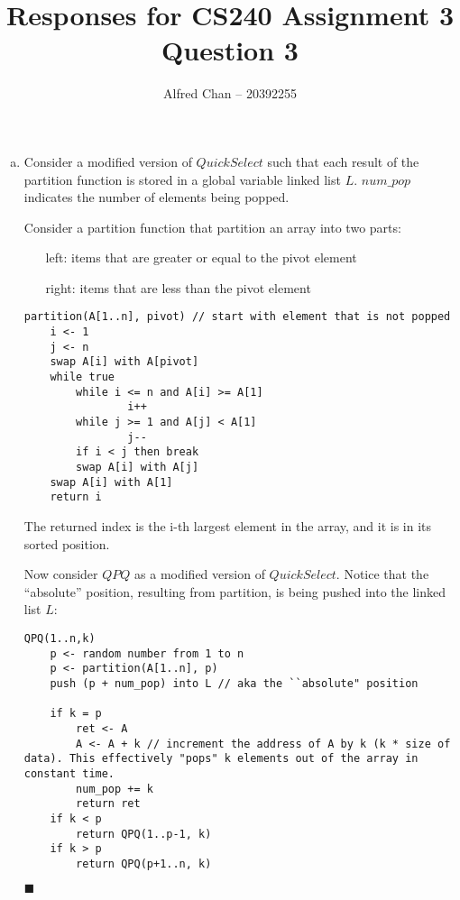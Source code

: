 \documentclass[12pt]{article}
\title{Responses for CS240 Assignment 3 Question 3}
\author{Alfred Chan -- 20392255}
\begin{document}

\maketitle
\begin{enumerate}[(a)]
\item Consider a modified version of $QuickSelect$ such that each result of the partition function is stored in a global variable linked list $L$. 
$num\_pop$ indicates the number of elements being popped.

Consider a partition function that partition an array into two parts:
\begin{itemize}
\item[left:] items that are greater or equal to the pivot element
\item[right:] items that are less than the pivot element
\end{itemize}
\begin{lstlisting}
partition(A[1..n], pivot) // start with element that is not popped
	i <- 1
	j <- n
	swap A[i] with A[pivot]
	while true
		while i <= n and A[i] >= A[1]
				i++
		while j >= 1 and A[j] < A[1]
				j--
		if i < j then break
		swap A[i] with A[j]
	swap A[i] with A[1]
	return i
\end{lstlisting}
The returned index is the i-th largest element in the array, and it is in its sorted position.

Now consider $QPQ$ as a modified version of $QuickSelect$.
Notice that the ``absolute'' position, resulting from partition, is being pushed into the linked list $L$:

\begin{lstlisting}
QPQ(1..n,k)
	p <- random number from 1 to n
	p <- partition(A[1..n], p)
	push (p + num_pop) into L // aka the ``absolute" position
	
	if k = p
		ret <- A
		A <- A + k // increment the address of A by k (k * size of data). This effectively "pops" k elements out of the array in constant time.
		num_pop += k
		return ret
	if k < p
		return QPQ(1..p-1, k)
	if k > p
		return QPQ(p+1..n, k)
\end{lstlisting}
\hfill $\blacksquare$


\end{enumerate}
\end{document}

